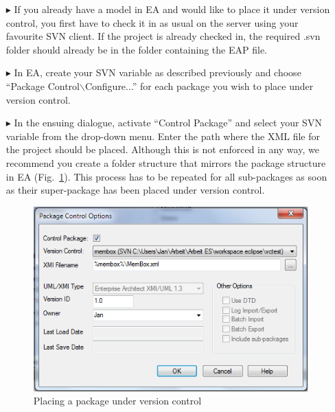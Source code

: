 \begin{enumerate}
\item[$\blacktriangleright$] If you already have a model in EA and would like to place it under version control, you first have to check it in as usual on the server using your favourite SVN client. 
If the project is already checked in, the required .svn folder should already be in the folder containing the EAP file.

\item[$\blacktriangleright$] In EA, create your SVN variable as described previously and choose ``Package Control$\backslash$Configure...'' for each package you wish to place under version control. 

\item[$\blacktriangleright$] In the ensuing dialogue, activate ``Control Package'' and select your SVN variable from the drop-down menu. 
Enter the path where the XML file for the project should be placed.
Although this is not enforced in any way, we recommend you create a folder structure that mirrors the package structure in EA (Fig.~\ref{fig:advanced-topics-eaSVN-addPackage}).
This process has to be repeated for all sub-packages as soon as their super-package has been placed under version control.

\begin{figure}[htbp]
\begin{center} 
	\includegraphics[scale=0.65]{pics/advancedTopics/eaSVN/cont.png}
	\caption{Placing a package under version control}
  	\label{fig:advanced-topics-eaSVN-addPackage}
\end{center}
\end{figure}

\end{enumerate}